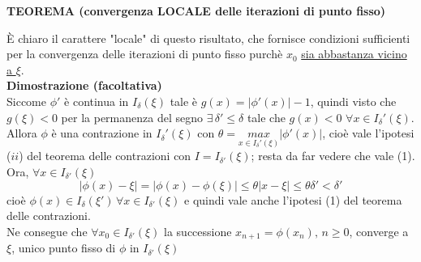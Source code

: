 \documentclass[12pt]{article}
\begin{document}
\bigskip
\textbf{TEOREMA (convergenza LOCALE delle iterazioni di punto fisso)}
\begin{center}
\end{center}
È chiaro il carattere "locale" di questo risultato, che fornisce
condizioni sufficienti per la convergenza delle iterazioni di punto fisso purchè $x_0$ \underline{sia abbastanza vicino a $\xi$}.\\
\textbf{Dimostrazione (facoltativa)}\\
Siccome $\phi'$ è continua in $I_{\delta}(\xi)$ tale è $g(x)=|\phi'(x)|-1$, quindi visto che $g(\xi)<0$ per la permanenza del segno $\exists \, \delta'\le \delta$ tale che $g(x)<0$ $\forall x\in I_{\delta}'(\xi)$. Allora $\phi$ è una contrazione in $I_{\delta}'(\xi)$ con $\theta=\underset{x \in I_{\delta}'(\xi)}{max}|\phi'(x)|$, cioè vale l'ipotesi ($ii$) del teorema delle contrazioni con $I=I_{\delta'}(\xi)$; resta da far vedere che vale (1).\\
Ora, $\forall x \in I_{\delta'}(\xi)$
\begin{equation*}
    |\phi(x) - \xi| = |\phi(x) - \phi(\xi)| \leq \theta|x-\xi| \leq \theta \delta' < \delta'
\end{equation*}
cioè $\phi(x) \in I_\delta(\xi')\, \forall x \in I_{\delta'}(\xi)$ e quindi vale anche l'ipotesi (1) del teorema delle contrazioni. \\
Ne consegue che $\forall x_0 \in I_{\delta'}(\xi)$ la successione $x_{n+1} = \phi(x_n), \, n \ge 0$, converge a $\xi$, unico punto fisso di $\phi$ in $I_{\delta'}(\xi)$
\end{document}

